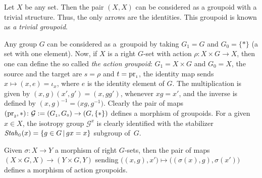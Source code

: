 \documentclass[pdftex]{sigma}
\numberwithin{equation}{section}
\newcommand{\cG}{{\mathcal G}}
\newcommand{\Sscript}[1]{\scriptscriptstyle{#1}}
\begin{document}
\begin{Example}\label{exam:trivial}Let $X$ be any set. Then the pair $(X, X)$ can be considered as a groupoid with a trivial structure. Thus, the only arrows are the identities. This groupoid is known as \emph{a trivial groupoid}.
\end{Example}

\begin{Example}\label{exam:action}  Any group $G$ can be considered as a~groupoid by taking $G_{\Sscript{1}}=G$ and $G_{\Sscript{0}}=\{*\}$ (a set with one element). Now, if $X$ is a right $G$-set with action $\rho\colon X\times G \to X$, then one can define the so called \emph{the action groupoid}: $G_{\Sscript{1}}=X \times G$ and $G_{\Sscript{0}}=X$, the source and the target are $s=\rho$ and $t={\rm pr}_{\Sscript{1}}$, the identity map sends $x \mapsto (x, e)=\iota_{\Sscript{x}}$, where $e$ is the identity element of $G$. The multiplication is given by $(x,g) (x',g')=(x,gg')$, whenever $xg=x'$, and the inverse is defined by $(x,g)^{-1}=\big(xg,g^{-1}\big)$. Clearly the pair of maps $({\rm pr}_{\Sscript{2}}, *)\colon \cG:= (G_{\Sscript{1}}, G_{\Sscript{0}}) \to (G,\{*\})$ defines a morphism of groupoids. For a given $ x \in X$, the isotropy group $\cG^{\Sscript{x}}$ is clearly identified with the stabilizer $\emph{Stab}_{\Sscript{G}}(x)=\{g \in G \,|\, gx=x\}$ subgroup of~$G$.

Given $\sigma\colon X \to Y$ a morphism of right $G$-sets, then the pair of maps $(X\times G, X) \to (Y\times G, Y)$ sending $\big( (x,g), x' \big) \mapsto \big( (\sigma(x), g),\sigma(x') \big)$ defines a morphism of action groupoids.
\end{Example}
\end{document}

